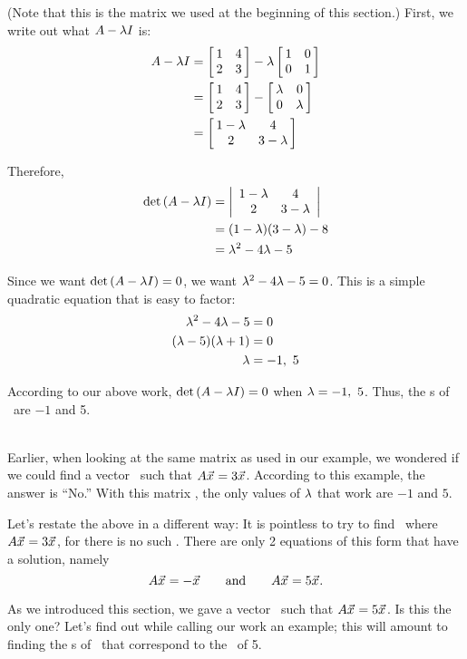 {(Note that this is the matrix we used at the beginning of this section.) First, we write out what $\tta-\lda\tti$ is: 
\begin{align*}
\tta-\lda\tti &= \bmx{cc}1&4\\2&3\emx - \lda\eyetwo \\
							&= \bmx{cc}1&4\\2&3\emx - \bmx{cc}\lda&0\\0&\lda\emx\\
							&= \bmx{cc}1-\lda & 4 \\ 2&3-\lda\emx
\end{align*}

Therefore, 
\begin{align*}
\det{\tta-\lda\tti} &= \bdt{cc}1-\lda & 4 \\ 2&3-\lda\edt \\
										&= (1-\lda)(3-\lda)-8\\
										&= \lda^2-4\lda-5
\end{align*}

Since we want $\det{\tta-\lda\tti}=0$, we want $\lda^2-4\lda-5=0$. This is a simple quadratic equation that is easy to factor:
\begin{align*}
\lda^2-4\lda-5 &= 0\\
(\lda-5)(\lda+1) & = 0\\
\lda &= -1,\ 5
\end{align*}

According to our above work, $\det{\tta-\lda\tti}=0$ when $\lda = -1,\ 5$. Thus, the \el s of \tta\ are $-1$ and 5.}\\ %

Earlier, when looking at the same matrix as used in our example, we wondered if we could find a vector \vx\ such that $\tta\vx=3\vx$. According to this example, the answer is ``No.'' With this matrix \tta, the only values of $\lda$ that work are $-1$ and $5$.

Let's restate the above in a different way: It is pointless to try to find \vx\ where $\tta\vx=3\vx$, for there is no such \vx. There are only 2 equations of this form that have a solution, namely $$\tta\vx = -\vx \quad\quad \text{and} \quad \quad \tta\vx=5\vx.$$

As we introduced this section, we gave a vector \vx\ such that $\tta\vx = 5\vx$. Is this the only one? Let's find out while calling our work an example; this will amount to finding the \ev s of \tta\ that correspond to the \ev\ of 5.\\

